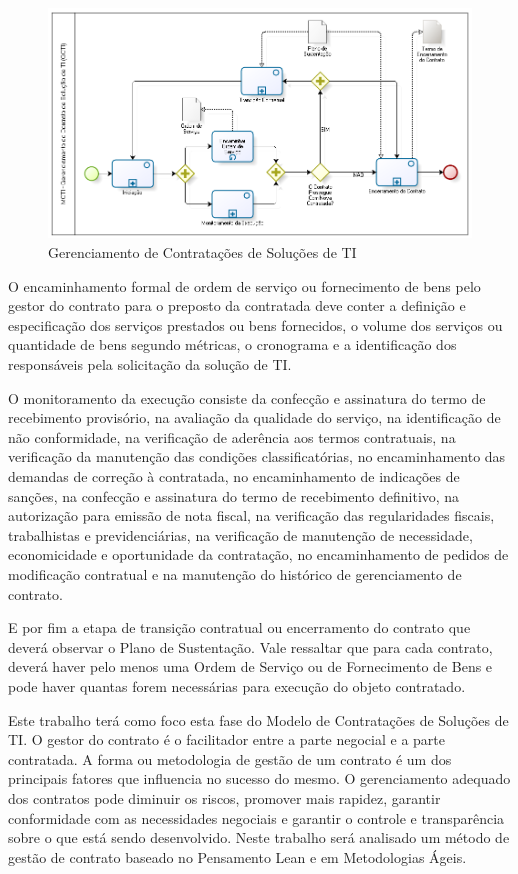 \begin{figure}[H]
		\centering
		\label{fig05}
			\includegraphics[scale=0.6]{figuras/GCTI.png}
		\caption{Gerenciamento de Contratações de Soluções de TI   \cite{mcti}}
\end{figure}



O encaminhamento formal de ordem de serviço ou fornecimento de bens pelo gestor do contrato para o preposto da contratada deve conter a definição e especificação dos serviços prestados ou bens fornecidos, o volume dos serviços ou quantidade de bens segundo métricas, o cronograma e a identificação dos responsáveis pela solicitação da solução de TI. 

O monitoramento da execução consiste da confecção e assinatura do termo de recebimento provisório, na avaliação da qualidade do serviço, na identificação de não conformidade, na verificação de aderência aos termos contratuais, na verificação da manutenção das condições classificatórias, no encaminhamento das demandas de correção à contratada, no encaminhamento de indicações de sanções, na confecção e assinatura do termo de recebimento definitivo, na autorização para emissão de nota fiscal, na verificação das regularidades fiscais, trabalhistas e previdenciárias, na verificação de manutenção de necessidade, economicidade e oportunidade da contratação, no encaminhamento de pedidos de modificação contratual e na manutenção do histórico de gerenciamento de contrato. 

E por fim a etapa de transição contratual ou encerramento do contrato que deverá observar o Plano de Sustentação. Vale ressaltar que para cada contrato, deverá haver pelo menos uma Ordem de Serviço ou de Fornecimento de Bens e pode haver quantas forem necessárias para execução do objeto contratado.

Este trabalho terá como foco esta fase do Modelo de Contratações de Soluções de TI. O gestor do contrato é o facilitador entre a parte negocial e a parte contratada. A forma ou metodologia de gestão de um contrato é um dos principais fatores que influencia no sucesso do mesmo. O gerenciamento adequado dos contratos pode diminuir os riscos, promover mais rapidez, garantir conformidade com as necessidades negociais e garantir o controle e transparência sobre o que está sendo desenvolvido. Neste trabalho será analisado um método de gestão de contrato baseado no Pensamento Lean e em Metodologias Ágeis.



	